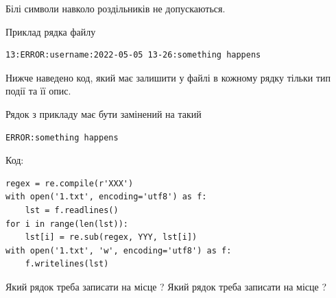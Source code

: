 \documentclass[12pt, ukrainian]{article}
\begin{document}
{Білі символи навколо роздільників не допускаються.

Приклад рядка файлу



\begin{verbatim}
13:ERROR:username:2022-05-05 13-26:something happens
\end{verbatim}


Нижче наведено код, який має залишити у файлі в кожному рядку тільки тип події та її опис.

Рядок з прикладу має бути замінений на такий



\begin{verbatim}
ERROR:something happens
\end{verbatim}




Код:



\begin{verbatim}
regex = re.compile(r'XXX')
with open('1.txt', encoding='utf8') as f:
    lst = f.readlines()
for i in range(len(lst)):
    lst[i] = re.sub(regex, YYY, lst[i])
with open('1.txt', 'w', encoding='utf8') as f:
    f.writelines(lst)
\end{verbatim}







Який рядок треба записати на місце  ?
Який рядок треба записати на місце  ?\par

}
\end{document}
